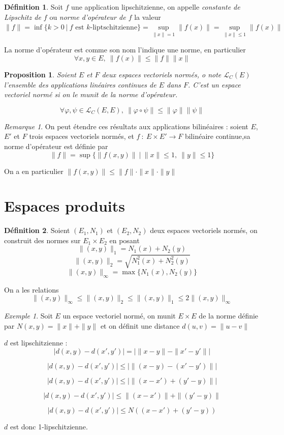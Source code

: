\documentclass[]{article}
\newtheorem{myproposition}{Proposition}
\theoremstyle{remark}
\newtheorem{myrem}{Remarque}
\newtheorem{myexmpl}{Exemple}
\theoremstyle{definition}
\newtheorem{mydef}{Définition}
\newcommand{\funcshort}[3]{
#1 ~ : ~ #2 \longrightarrow #3
}
\begin{document}
\begin{mydef}
	Soit $f$ une application lipschitzienne, on appelle \textit{constante de Lipschitz de $f$} ou \textit{norme d'opérateur de $f$} la valeur $\|f\| = \inf \{k > 0 ~|~ f \text{ est }k \text{-liptschitzienne}\} = \sup\limits_{\|x\|=1} \|f(x)\| = \sup\limits_{\|x\| \leqslant1} \|f(x)\|$
\end{mydef}

La norme d'opérateur est comme son nom l'indique une norme, en particulier $$\forall x, y \in E, ~ \|f(x)\|\leqslant \|f\|\|x\|$$

\begin{myproposition}
	Soient $E$ et $F$ deux espaces vectoriels normés, o note $\mathcal{L}_C(E)$ l'ensemble des applications linéaires continues de $E$ dans $F$. C'est un espace vectoriel normé si on le munit de la norme d'opérateur.
	
	$$\forall \varphi, \psi \in \mathcal{L}_C(E, E), ~ \|\varphi \circ \psi\| \leqslant \|\varphi\| \|\psi\|$$
\end{myproposition}

\begin{myrem}
	On peut étendre ces résultats aux applications bilinéaires : soient $E$, $E'$ et $F$ trois espaces vectoriels normés, et $\funcshort{f}{E \times E'}{F}$ bilinéaire continue,sa norme d'opérateur est définie par
	$$\|f\| = \sup\{\|f(x, y)\| ~ | ~ \|x\| \leqslant 1, ~ \|y\| \leqslant 1\}$$
	
	On a en particulier $\|f(x,y)\| \leqslant \|f\| \cdot \|x\| \cdot \|y\|$
\end{myrem}

\section{Espaces produits}

\begin{mydef}
	Soient $(E_1, N_1)$ et $(E_2, N_2)$ deux espaces vectoriels normés, on construit des normes sur $E_1 \times E_2$ en posant
	$$\|(x, y)\|_1 = N_1(x) + N_2(y)$$
	$$\|(x, y)\|_2 = \sqrt{N_1^2(x) + N_2^2(y)}$$
	$$\|(x, y)\|_\infty = \max\{N_1(x), N_2(y)\}$$
\end{mydef}

On a les relations $$\|(x, y)\|_\infty \leqslant \|(x, y)\|_2 \leqslant \|(x, y)\|_1 \leqslant 2 \|(x, y)\|_\infty$$

\begin{myexmpl}
	Soit $E$ un espace vectoriel normé, on munit $E \times E$ de la norme définie par $N(x, y)=\|x\|+\|y\|$ et on définit une distance $d(u, v)=\|u-v\|$
	
	$d$ est lipschitzienne :
	$$|d(x, y) - d(x', y')|=|\|x-y\|-\|x'-y'\||$$
	
	$$|d(x, y) - d(x', y')| \leqslant |\|(x-y)-(x'-y')\||$$
	
	$$|d(x, y) - d(x', y')| \leqslant |\|(x-x')+(y'-y)\||$$

	$$|d(x, y) - d(x', y')| \leqslant \|(x-x')\|+\|(y'-y)\|$$
	
	$$|d(x, y) - d(x', y')| \leqslant N((x-x')+(y'-y))$$
	
	$d$ est donc 1-lipschitzienne.
\end{myexmpl}
\end{document}
